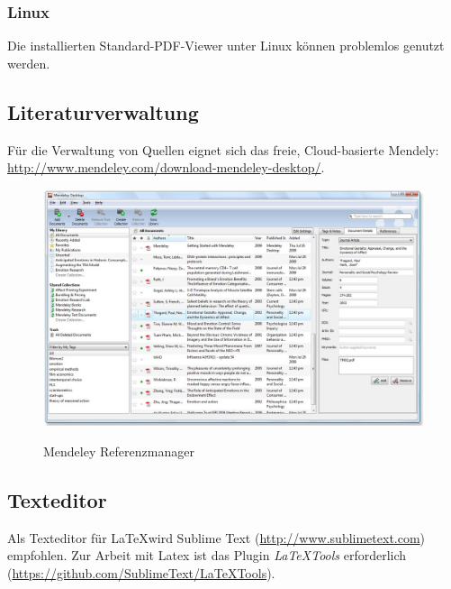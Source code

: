 \subsubsection{Linux}

Die installierten Standard-PDF-Viewer unter Linux können problemlos genutzt werden.

\subsection{Literaturverwaltung}

Für die Verwaltung von Quellen eignet sich das freie, Cloud-basierte Mendely: \url{http://www.mendeley.com/download-mendeley-desktop/}. 

\begin{figure}[hbt]
\centering
\begin{minipage}[t]{1\textwidth} %
\caption{Mendeley Referenzmanager} %
\includegraphics[width=1\textwidth]{img/Mendeley-destop-screenshot}\\ %
\end{minipage}
\end{figure}

\subsection{Texteditor}

Als Texteditor für \LaTeX wird Sublime Text (\url{http://www.sublimetext.com}) empfohlen. Zur Arbeit mit Latex ist das Plugin \emph{LaTeXTools} erforderlich (\url{https://github.com/SublimeText/LaTeXTools}).

